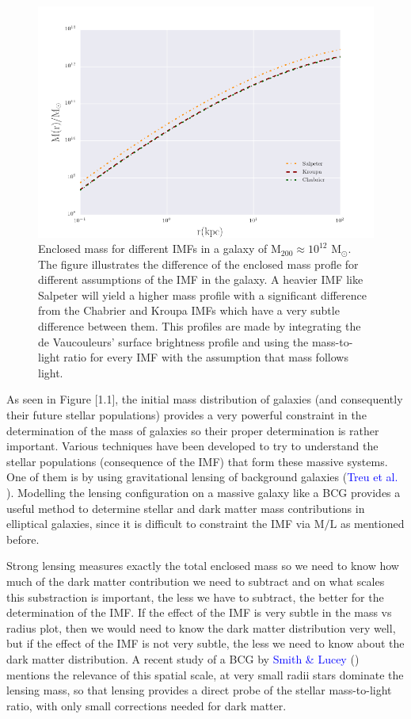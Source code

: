 \begin{figure}[H]
\centering
\includegraphics[width=12cm]{images/Enclosed_Mass_IMFs.png}
\caption[Enclosed mass for different IMFs in a galaxy]{Enclosed mass for different IMFs in a galaxy of $\textrm{M}_{200}\approx 10^{12}$ $\textrm{M}_{\odot}$. The figure illustrates the difference of the enclosed mass profle for different assumptions of the IMF in the galaxy. A heavier IMF like Salpeter will yield a higher mass profile with a significant difference from the Chabrier and Kroupa IMFs which have a very subtle difference between them. This profiles are made by integrating the de Vaucouleurs' surface brightness profile and using the mass-to-light ratio for every IMF with the assumption that mass follows light.}
\end{figure}   

As seen in Figure [1.1], the initial mass distribution of galaxies (and consequently their future stellar populations) provides a very powerful constraint in the determination of the mass of galaxies so their proper determination is rather important. Various techniques have been developed to try to understand the stellar populations (consequence of the IMF) that form these massive systems. One of them is by using gravitational lensing  of  background galaxies (\textcolor{blue}{Treu et al.} \citeyear{Reference1}). Modelling the lensing configuration on a massive galaxy like a BCG provides a useful method to determine stellar and dark matter mass contributions in elliptical galaxies, since it is difficult to constraint the IMF via $\textrm{M}/\text{L}$ as mentioned before. 

Strong lensing measures exactly the total enclosed mass so we need to know how much of the dark matter contribution we need to subtract and on what scales this substraction is important, the less we have to subtract, the better for the determination of the IMF. If the effect of the IMF is very subtle in the mass vs radius plot, then we would need to know the dark matter distribution very well, but if the effect of the IMF is not very subtle, the less we need to know about the dark matter distribution. A recent study of a BCG by \textcolor{blue}{Smith \& Lucey} (\citeyear{Reference7}) mentions the relevance of this spatial scale, at very small radii stars dominate the lensing mass, so that lensing provides a direct probe of the stellar mass-to-light ratio, with only small corrections needed for dark matter.  

